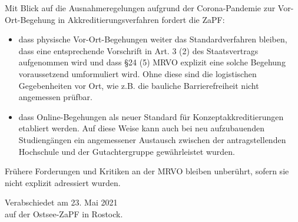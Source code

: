 \documentclass[DIV=calc]{scrartcl}
\begin{document}
Mit Blick auf die Ausnahmeregelungen aufgrund der Corona-Pandemie zur Vor-Ort-Begehung in Akkreditierungsverfahren fordert die ZaPF:

\begin{itemize}
	\item dass physische Vor-Ort-Begehungen weiter das Standardverfahren bleiben, dass eine entsprechende Vorschrift in Art. 3 (2) des Staatsvertrags aufgenommen wird und dass §24 (5) MRVO explizit eine solche Begehung voraussetzend umformuliert wird. Ohne diese sind die logistischen Gegebenheiten vor Ort, wie z.B. die bauliche Barrierefreiheit nicht angemessen prüfbar. 
	
	\item dass Online-Begehungen als neuer Standard für Konzeptakkreditierungen etabliert werden. Auf diese Weise kann auch bei neu aufzubauenden Studiengängen ein angemessener Austausch zwischen der antragstellenden Hochschule und der Gutachtergruppe gewährleistet wurden.
\end{itemize}

Frühere Forderungen und Kritiken an der MRVO bleiben unberührt, sofern sie nicht explizit adressiert wurden.
\vspace{1cm} 

\vfill
\begin{flushright}
	Verabschiedet am 23. Mai 2021 \\
	auf der Ostsee-ZaPF in Rostock.
\end{flushright}
\end{document}
